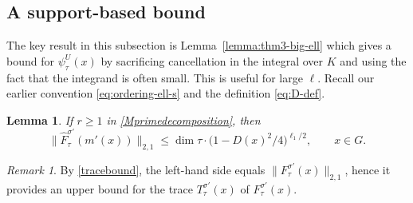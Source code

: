 \documentclass[11pt,oneside]{amsart}
\numberwithin{equation}{section}
\theoremstyle{remark}
\newtheorem{remark}{Remark}
\theoremstyle{plain}
\newtheorem{lemma}{Lemma}
\renewcommand\leq{\leqslant}
\renewcommand\geq{\geqslant}
\begin{document}
\subsection{A support-based bound}\label{sec43}
The key result in this subsection is Lemma~\ref{lemma:thm3-big-ell} which gives a bound for $\psi_{\tau}^{U}(x)$ by sacrificing cancellation in the integral over $K$ and using the fact that the integrand is often small. This is useful for large $\bm \ell$. Recall our earlier convention \eqref{eq:ordering-ell-s} and the definition \eqref{eq:D-def}. 

\begin{lemma}\label{lemma:hat-F-D} If $r\geq 1$ in \eqref{Mprimedecomposition}, then
\begin{equation}\label{eq:lemma5bound}
\|\hat F_{\tau}^{\sigma'} (m'(x))\|_{2,1}\leq \dim \tau \cdot \big(1 - D(x)^2/4 \big)^{\ell_1/2},\qquad x\in G.
\end{equation}
\end{lemma}

\begin{remark} By \eqref{tracebound}, the left-hand side equals $\|F_{\tau}^{\sigma'}(x)\|_{2,1}$, hence it provides an upper bound for the trace $T_{\tau}^{\sigma'}(x)$ of $F_{\tau}^{\sigma'}(x)$.
\end{remark}
\end{document}
